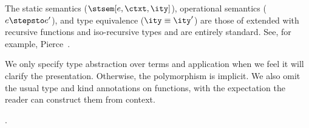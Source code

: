 The static semantics ($\stsem[e,\ctxt,\ity]$), operational
semantics ($e \stepsto e'$), and type 
equivalence ($\ity \equiv \ity'$) are those of \fomega{} extended with
recursive functions and iso-recursive types and are entirely standard.
See, for example, Pierce~\cite{pierce:tapl}.

We only specify type
abstraction over terms and application when we feel it will clarify
the presentation. Otherwise, the polymorphism is implicit.  We also
omit the usual type and kind annotations on functions, with the
expectation the reader can construct them from context.  

.



